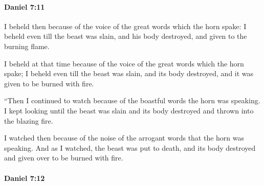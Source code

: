 		\paragraph{Daniel 7:11} %
			\label{DANIEL-7-11}

			I beheld then because of the voice of the great words which the horn spake: I beheld even till the beast was slain, and his body destroyed, and given to the burning flame.

			\begin{versebox}
					\item[BHS] 
					\item[LXX] 
					\item[ASV] I beheld at that time because of the voice of the great words which the horn spake; I beheld even till the beast was slain, and its body destroyed, and it was given to be burned with fire.
					\item[NIV] “Then I continued to watch because of the boastful words the horn was speaking. I kept looking until the beast was slain and its body destroyed and thrown into the blazing fire.
					\item[NRSV] I watched then because of the noise of the arrogant words that the horn was speaking. And as I watched, the beast was put to death, and its body destroyed and given over to be burned with fire.
			\end{versebox}

		\paragraph{Daniel 7:12} %
			\label{DANIEL-7-12}


